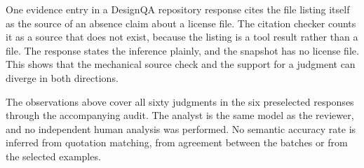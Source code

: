 One evidence entry in a DesignQA repository response cites the file listing itself as the source of an absence claim about a license file. The citation checker counts it as a source that does not exist, because the listing is a tool result rather than a file. The response states the inference plainly, and the snapshot has no license file. This shows that the mechanical source check and the support for a judgment can diverge in both directions.

The observations above cover all sixty judgments in the six preselected responses through the accompanying audit. The analyst is the same model as the reviewer, and no independent human analysis was performed. No semantic accuracy rate is inferred from quotation matching, from agreement between the batches or from the selected examples.
